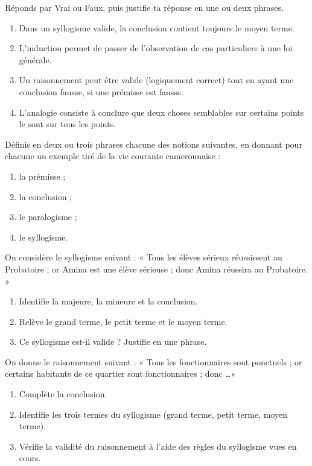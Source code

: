\documentclass[11pt]{article}
\newcounter{popsec}
\newcounter{popsub}
\newcommand{\courssub}[1]{%
  \stepcounter{popsub}%
  \par\vspace{9pt}\noindent{\popxbold\fontsize{11.5}{13}\selectfont\color{popink}{\color{poporange}\thepopsec.\thepopsub}\hspace{6pt}#1}\par\nopagebreak\vspace{4pt}
}
\begin{document}
\begin{exercice}
Réponds par Vrai ou Faux, puis justifie ta réponse en une ou deux phrases.
\begin{enumerate}
\item Dans un syllogisme valide, la conclusion contient toujours le moyen terme.
\item L'induction permet de passer de l'observation de cas particuliers à une loi générale.
\item Un raisonnement peut être valide (logiquement correct) tout en ayant une conclusion fausse, si une prémisse est fausse.
\item L'analogie consiste à conclure que deux choses semblables sur certains points le sont sur tous les points.
\end{enumerate}
\end{exercice}

\begin{exercice}[Définitions]
Définis en deux ou trois phrases chacune des notions suivantes, en donnant pour chacune un exemple tiré de la vie courante camerounaise :
\begin{enumerate}
\item la prémisse ;
\item la conclusion ;
\item le paralogisme ;
\item le syllogisme.
\end{enumerate}
\end{exercice}

\begin{exercice}
On considère le syllogisme suivant : « Tous les élèves sérieux réussissent au Probatoire ; or Amina est une élève sérieuse ; donc Amina réussira au Probatoire. »
\begin{enumerate}
\item Identifie la majeure, la mineure et la conclusion.
\item Relève le grand terme, le petit terme et le moyen terme.
\item Ce syllogisme est-il valide ? Justifie en une phrase.
\end{enumerate}
\end{exercice}

\courssub{Je m'entraîne}

\begin{exercice}
On donne le raisonnement suivant : « Tous les fonctionnaires sont ponctuels ; or certains habitants de ce quartier sont fonctionnaires ; donc \ldots »
\begin{enumerate}
\item Complète la conclusion.
\item Identifie les trois termes du syllogisme (grand terme, petit terme, moyen terme).
\item Vérifie la validité du raisonnement à l'aide des règles du syllogisme vues en cours.
\end{enumerate}
\end{exercice}
\end{document}
